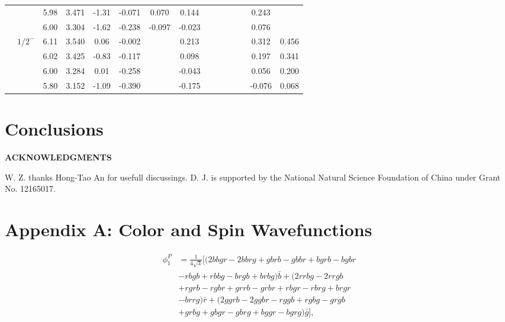 \documentclass[prd,twocolumn,floatfix,nofootinbib]{revtex4}
\begin{document}
\begin{table*}[!htbp]
\begin{tabular}{cc|ccc|cccccccccc}
            &               &5.98   &3.471  &-1.31 &-0.071 &0.070 &0.144 & & & & & &0.243 & \\
            &               &6.00   &3.304  &-1.62 &-0.238 &-0.097 &-0.023 & & & & & &0.076 & \\
            &${1/2}^{-}$    &6.11   &3.540  &0.06 &-0.002 & &0.213 & & & & & &0.312 &0.456 \\
            &               &6.02   &3.425  &-0.83 &-0.117 & &0.098 & & & & & &0.197 &0.341 \\
            &               &6.00   &3.284  &0.01 &-0.258 & &-0.043 & & & & & &0.056 &0.200 \\
            &               &5.80   &3.152  &-1.09 &-0.390 & &-0.175 & & & & & &-0.076 &0.068 \\  
        \bottomrule[0.5pt]\bottomrule[1.5pt]
    \end{tabular}
\end{table*}


\section{Conclusions}\label{sec:conclusions}



\medskip
\textbf{ACKNOWLEDGMENTS}

W. Z. thanks Hong-Tao An for usefull discussings. 
D. J. is supported by the National Natural Science Foundation of China under Grant No. 12165017.


\medskip
\section*{Appendix A: Color and Spin Wavefunctions}\label{apd:WF}
\setcounter{equation}{0}
\renewcommand{\theequation}{A\arabic{equation}}

\begin{equation}
    \begin{aligned}
        \phi_{1}^{P} &=\frac{1}{4\sqrt{3}}\Big[(2bbgr-2bbrg+gbrb-gbbr+bgrb-bgbr \nonumber\\
        &-rbgb+rbbg-brgb+brbg)\bar{b}+(2rrbg-2rrgb \nonumber\\
        &+rgrb-rgbr+grrb-grbr+rbgr-rbrg+brgr\nonumber\\
        &-brrg)\bar{r}+(2ggrb-2ggbr-rggb+rgbg-grgb \nonumber\\
        &+grbg+gbgr-gbrg+bggr-bgrg)\bar{g}\Big],    
    \end{aligned}
\end{equation}
    
\end{document}

